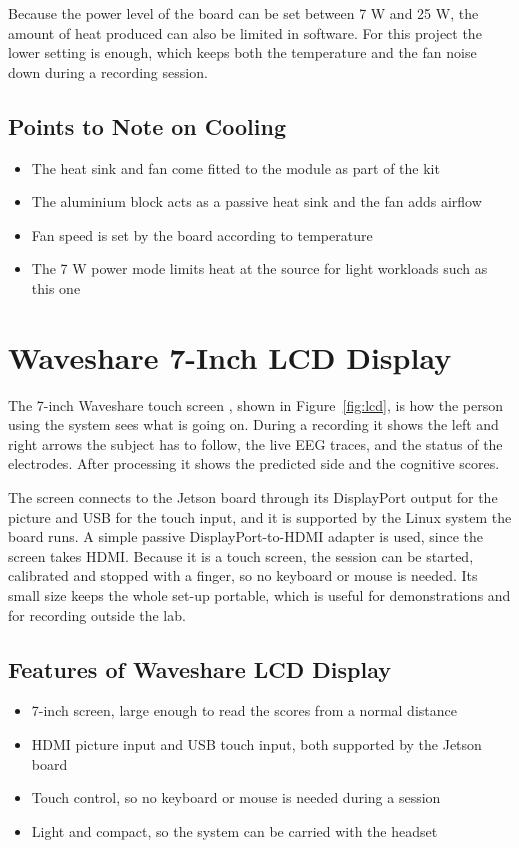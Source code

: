 Because the power level of the board can be set between 7 W and 25 W, the amount of heat
produced can also be limited in software. For this project the lower setting is enough,
which keeps both the temperature and the fan noise down during a recording session.

\subsection{Points to Note on Cooling}

\begin{itemize}
    \item The heat sink and fan come fitted to the module as part of the kit
    \item The aluminium block acts as a passive heat sink and the fan adds airflow
    \item Fan speed is set by the board according to temperature
    \item The 7 W power mode limits heat at the source for light workloads such as this one
\end{itemize}

\section{Waveshare 7-Inch LCD Display}

The 7-inch Waveshare touch screen \cite{waveshare7inch}, shown in Figure~\ref{fig:lcd}, is
how the person using the system sees what is going on. During a recording it shows the
left and right arrows the subject has to follow, the live EEG traces, and the status of
the electrodes. After processing it shows the predicted side and the cognitive scores.

The screen connects to the Jetson board through its DisplayPort output for the picture and
USB for the touch input, and it is supported by the Linux system the board runs. A simple
passive DisplayPort-to-HDMI adapter is used, since the screen takes HDMI. Because it is a
touch
screen, the session can be started, calibrated and stopped with a finger, so no keyboard or
mouse is needed. Its small size keeps the whole set-up portable, which is useful for
demonstrations and for recording outside the lab.

\subsection{Features of Waveshare LCD Display}
\begin{itemize}
    \item 7-inch screen, large enough to read the scores from a normal distance
    \item HDMI picture input and USB touch input, both supported by the Jetson board
    \item Touch control, so no keyboard or mouse is needed during a session
    \item Light and compact, so the system can be carried with the headset
\end{itemize}

